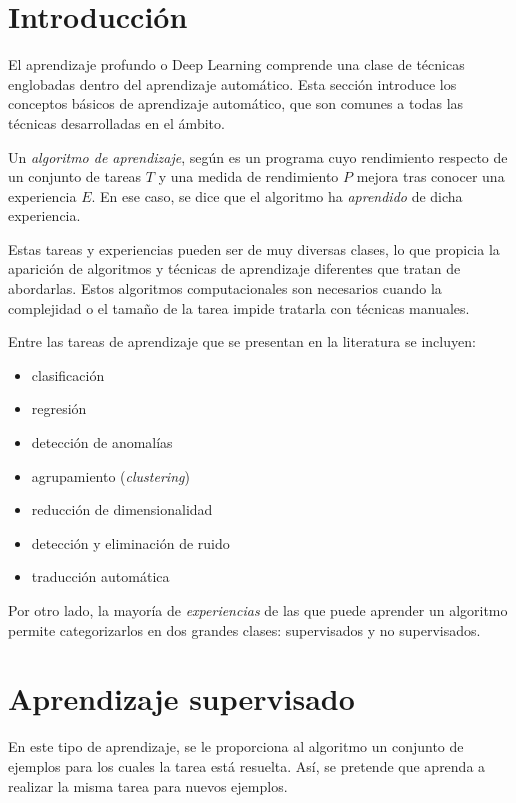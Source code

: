 \section{Introducción}\label{introducciuxf3n}

El aprendizaje profundo o Deep Learning comprende una clase de técnicas
englobadas dentro del aprendizaje automático. Esta sección introduce los
conceptos básicos de aprendizaje automático, que son comunes a todas las
técnicas desarrolladas en el ámbito.

Un \emph{algoritmo de aprendizaje}, según \textcite{mitchell1997} es un
programa cuyo rendimiento respecto de un conjunto de tareas \(T\) y una
medida de rendimiento \(P\) mejora tras conocer una experiencia \(E\).
En ese caso, se dice que el algoritmo ha \emph{aprendido} de dicha
experiencia.

Estas tareas y experiencias pueden ser de muy diversas clases, lo que
propicia la aparición de algoritmos y técnicas de aprendizaje diferentes
que tratan de abordarlas. Estos algoritmos computacionales son
necesarios cuando la complejidad o el tamaño de la tarea impide tratarla
con técnicas manuales.

Entre las tareas de aprendizaje que se presentan en la literatura se
incluyen:

\begin{itemize}
\tightlist
\item
  clasificación
\item
  regresión
\item
  detección de anomalías
\item
  agrupamiento (\emph{clustering})
\item
  reducción de dimensionalidad
\item
  detección y eliminación de ruido
\item
  traducción automática
\end{itemize}

Por otro lado, la mayoría de \emph{experiencias} de las que puede
aprender un algoritmo permite categorizarlos en dos grandes clases:
supervisados y no supervisados.

\section{Aprendizaje supervisado}\label{aprendizaje-supervisado}

En este tipo de aprendizaje, se le proporciona al algoritmo un conjunto
de ejemplos para los cuales la tarea está resuelta. Así, se pretende que
aprenda a realizar la misma tarea para nuevos ejemplos.

